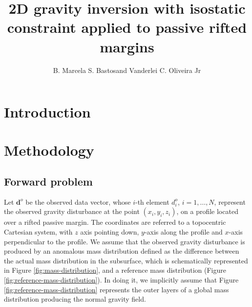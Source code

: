 \documentclass[manuscript]{geophysics}
\begin{document}
\title{2D gravity inversion with isostatic constraint applied to passive rifted margins}

\renewcommand{\thefootnote}{\fnsymbol{footnote}} 


\address{
\footnotemark[1]Observat\'{o}rio Nacional, \\
Department of Geophysics, \\
Rio de Janeiro, Brazil}
\author{B. Marcela S. Bastos\footnotemark[1] and Vanderlei C. Oliveira Jr\footnotemark[1]}


\maketitle

\begin{abstract}

\lipsum[1]

\end{abstract}

\section{Introduction}

\lipsum[1-5]

\section{Methodology}


\subsection{Forward problem}


Let $\mathbf{d}^{o}$ be the observed data vector, whose $i$-th element $d^{o}_{i}$, 
$i = 1, \dots, N$, represent the observed gravity disturbance at the point 
$(x_{i}, y_{i}, z_{i})$, on a profile located over a rifted passive margin. The
coordinates are referred to a topocentric Cartesian system, with $z$ axis pointing
down, $y$-axis along the profile and $x$-axis perpendicular to the profile. 
We assume that the observed gravity disturbance is produced by an anomalous 
mass distribution defined as the difference between the actual mass distribution
in the subsurface, which is schematically represented in Figure \ref{fig:mass-distribution},
and a reference mass distribution (Figure \ref{fig:reference-mass-distribution}).
In doing it, we implicitly assume that Figure \ref{fig:reference-mass-distribution}
represents the outer layers of a global mass distribution producing the
normal gravity field. 
\end{document}
